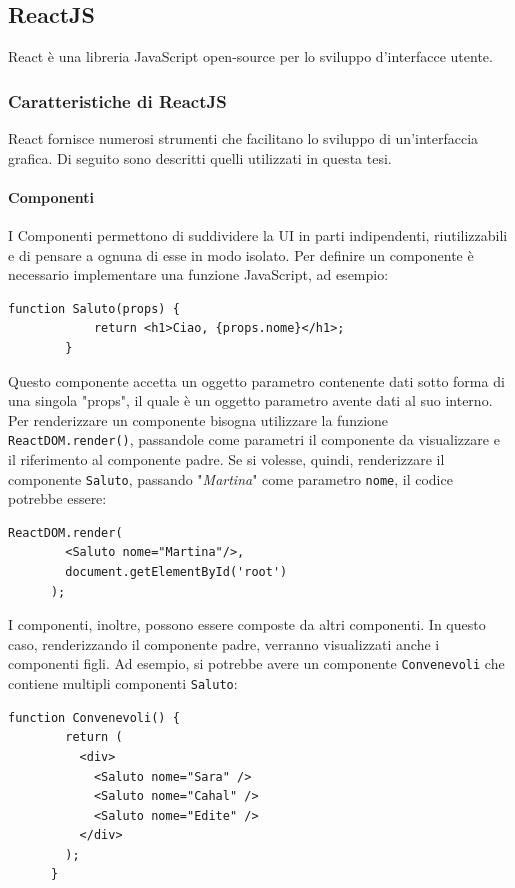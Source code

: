 \documentclass[a4paper]{article}
\begin{document}
    \subsection{ReactJS}
    React è una libreria JavaScript open-source per lo sviluppo d'interfacce utente.
    \subsubsection{Caratteristiche di ReactJS}
    React fornisce numerosi strumenti che facilitano lo sviluppo di un'interfaccia grafica. Di seguito sono descritti quelli utilizzati in questa tesi.
    \paragraph{Componenti}
    I Componenti permettono di suddividere la UI in parti indipendenti, riutilizzabili e di pensare a ognuna di esse in modo isolato.
    Per definire un componente è necessario implementare una funzione JavaScript, ad esempio:

    \begin{lstlisting}[style=ES6, title={Esempio componente}]
        function Saluto(props) {
            return <h1>Ciao, {props.nome}</h1>;
        }\end{lstlisting}

    Questo componente accetta un oggetto parametro contenente dati sotto forma di una singola
    "props", il quale è un oggetto parametro avente dati al suo interno.
    Per renderizzare un componente bisogna utilizzare la funzione \verb|ReactDOM.render()|,
    passandole come parametri il componente da visualizzare e il riferimento al componente padre.
    Se si volesse, quindi, renderizzare il componente \verb|Saluto|, passando "\emph{Martina}" come parametro \verb|nome|, il codice potrebbe essere:
    
    \begin{lstlisting}[style=ES6, title={Esempio composizione di componenti}]
      ReactDOM.render(
        <Saluto nome="Martina"/>, 
        document.getElementById('root')
      );\end{lstlisting}
    
    I componenti, inoltre, possono essere composte da altri componenti. In questo caso,
    renderizzando il componente padre, verranno visualizzati anche i componenti figli. Ad esempio, 
    si potrebbe avere un componente \verb|Convenevoli| che contiene multipli componenti \verb|Saluto|:
    \begin{lstlisting}[style=ES6, title={Esempio renderizzazione componente}]
      function Convenevoli() {
        return (
          <div>
            <Saluto nome="Sara" />
            <Saluto nome="Cahal" />
            <Saluto nome="Edite" />
          </div>
        );
      }\end{lstlisting}
\end{document}
